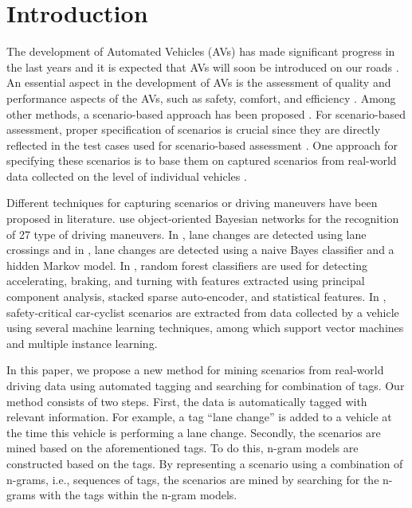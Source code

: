 \section{Introduction}
\label{sec:introduction}

\cstarta
The development of Automated Vehicles (AVs) has made significant progress in the last years and it is expected that AVs will soon be introduced on our roads \autocite{bimbraw2015autonomous, madni2018autonomous}. 
An essential aspect in the development of AVs is the assessment of quality and performance aspects of the AVs, such as safety, comfort, and efficiency \autocite{bengler2014threedecades, stellet2015taxonomy}. 
Among other methods, a scenario-based approach has been proposed \autocite{elrofai2018scenario, putz2017pegasus}. 
For scenario-based assessment, proper specification of scenarios is crucial since they are directly reflected in the test cases used for scenario-based assessment \autocite{stellet2015taxonomy}. 
One approach for specifying these scenarios is to base them on captured scenarios from real-world data collected on the level of individual vehicles \autocite{elrofai2018scenario, putz2017pegasus, roesener2016scenariobased, deGelder2017assessment}. 

Different techniques for capturing scenarios or driving maneuvers have been proposed in literature. 
\textcite{kasper2012oobayesnetworks} use object-oriented Bayesian networks for the recognition of 27 type of driving maneuvers. 
In \autocite{krajewski2018highD}, lane changes are detected using lane crossings and in \autocite{schlechtriemen2015lanechange}, lane changes are detected using a naive Bayes classifier and a hidden Markov model. 
In \cite{xie2017driving}, random forest classifiers are used for detecting accelerating, braking, and turning with features extracted using principal component analysis, stacked sparse auto-encoder, and statistical features.
In \autocite{cara2015carcyclist}, safety-critical car-cyclist scenarios are extracted from data collected by a vehicle using several machine learning techniques, among which support vector machines and multiple instance learning.

In this paper, we propose a new method for mining scenarios from real-world driving data using automated tagging and searching for combination of tags. 
Our method consists of two steps. First, the data is automatically tagged with relevant information. For example, a tag ``lane change'' is added to a vehicle at the time this vehicle is performing a lane change. Secondly, the scenarios are mined based on the aforementioned tags. To do this, n-gram models are constructed based on the tags. By representing a scenario using a combination of n-grams, i.e., sequences of tags, the scenarios are mined by searching for the n-grams with the tags within the n-gram models.

